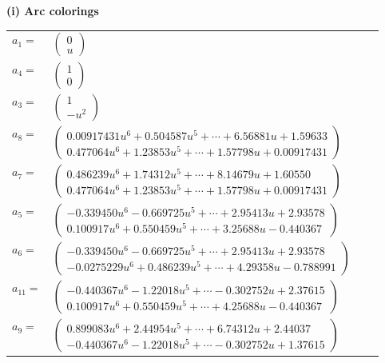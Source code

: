 \documentclass[1p]{elsarticle_modified}
\theoremstyle{definition}
\begin{document}
\flushleft \textbf{(i) Arc colorings}\\
\begin{tabular}{m{7pt} m{180pt} m{7pt} m{180pt} }
\flushright $a_{1}=$&$\begin{pmatrix}0\\u\end{pmatrix}$ \\
\flushright $a_{4}=$&$\begin{pmatrix}1\\0\end{pmatrix}$ \\
\flushright $a_{3}=$&$\begin{pmatrix}1\\- u^2\end{pmatrix}$ \\
\flushright $a_{8}=$&$\begin{pmatrix}0.00917431 u^{6}+0.504587 u^{5}+\cdots+6.56881 u+1.59633\\0.477064 u^{6}+1.23853 u^{5}+\cdots+1.57798 u+0.00917431\end{pmatrix}$ \\
\flushright $a_{7}=$&$\begin{pmatrix}0.486239 u^{6}+1.74312 u^{5}+\cdots+8.14679 u+1.60550\\0.477064 u^{6}+1.23853 u^{5}+\cdots+1.57798 u+0.00917431\end{pmatrix}$ \\
\flushright $a_{5}=$&$\begin{pmatrix}-0.339450 u^{6}-0.669725 u^{5}+\cdots+2.95413 u+2.93578\\0.100917 u^{6}+0.550459 u^{5}+\cdots+3.25688 u-0.440367\end{pmatrix}$ \\
\flushright $a_{6}=$&$\begin{pmatrix}-0.339450 u^{6}-0.669725 u^{5}+\cdots+2.95413 u+2.93578\\-0.0275229 u^{6}+0.486239 u^{5}+\cdots+4.29358 u-0.788991\end{pmatrix}$ \\
\flushright $a_{11}=$&$\begin{pmatrix}-0.440367 u^{6}-1.22018 u^{5}+\cdots-0.302752 u+2.37615\\0.100917 u^{6}+0.550459 u^{5}+\cdots+4.25688 u-0.440367\end{pmatrix}$ \\
\flushright $a_{9}=$&$\begin{pmatrix}0.899083 u^{6}+2.44954 u^{5}+\cdots+6.74312 u+2.44037\\-0.440367 u^{6}-1.22018 u^{5}+\cdots-0.302752 u+1.37615\end{pmatrix}$ \\

\end{tabular}
\end{document}
